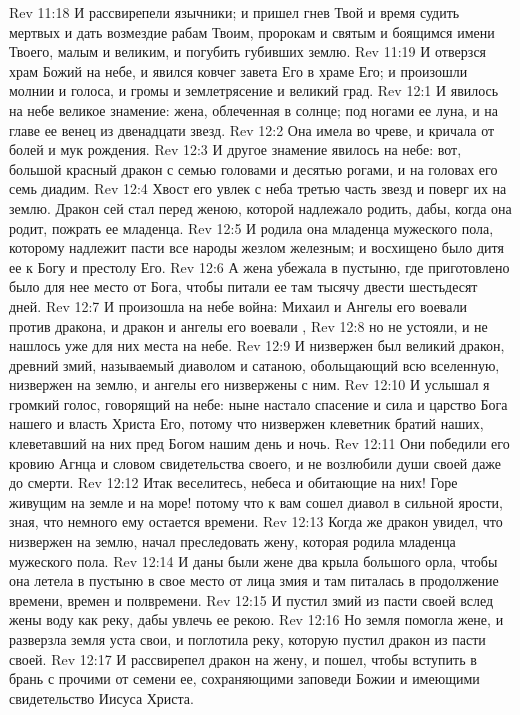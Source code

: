 \vs Rev 11:18 И рассвирепели язычники; и пришел гнев Твой и время судить мертвых и дать возмездие рабам Твоим, пророкам и святым и боящимся имени Твоего, малым и великим, и погубить губивших землю.
\rsbpar\vs Rev 11:19 И отверзся храм Божий на небе, и явился ковчег завета Его в храме Его; и произошли молнии и голоса, и громы и землетрясение и великий град.
\vs Rev 12:1 И явилось на небе великое знамение: жена, облеченная в солнце; под ногами ее луна, и на главе ее венец из двенадцати звезд.
\vs Rev 12:2 Она имела во чреве, и кричала от болей и мук рождения.
\vs Rev 12:3 И другое знамение явилось на небе: вот, большой красный дракон с семью головами и десятью рогами, и на головах его семь диадим.
\vs Rev 12:4 Хвост его увлек с неба третью часть звезд и поверг их на землю. Дракон сей стал перед женою, которой надлежало родить, дабы, когда она родит, пожрать ее младенца.
\vs Rev 12:5 И родила она младенца мужеского пола, которому надлежит пасти все народы жезлом железным; и восхищено было дитя ее к Богу и престолу Его.
\vs Rev 12:6 А жена убежала в пустыню, где приготовлено было для нее место от Бога, чтобы питали ее там тысячу двести шестьдесят дней.
\rsbpar\vs Rev 12:7 И произошла на небе война: Михаил и Ангелы его воевали против дракона, и дракон и ангелы его воевали ,
\vs Rev 12:8 но не устояли, и не нашлось уже для них места на небе.
\vs Rev 12:9 И низвержен был великий дракон, древний змий, называемый диаволом и сатаною, обольщающий всю вселенную, низвержен на землю, и ангелы его низвержены с ним.
\vs Rev 12:10 И услышал я громкий голос, говорящий на небе: ныне настало спасение и сила и царство Бога нашего и власть Христа Его, потому что низвержен клеветник братий наших, клеветавший на них пред Богом нашим день и ночь.
\vs Rev 12:11 Они победили его кровию Агнца и словом свидетельства своего, и не возлюбили души своей даже до смерти.
\vs Rev 12:12 Итак веселитесь, небеса и обитающие на них! Горе живущим на земле и на море! потому что к вам сошел диавол в сильной ярости, зная, что немного ему остается времени.
\rsbpar\vs Rev 12:13 Когда же дракон увидел, что низвержен на землю, начал преследовать жену, которая родила младенца мужеского пола.
\vs Rev 12:14 И даны были жене два крыла большого орла, чтобы она летела в пустыню в свое место от лица змия и там питалась в продолжение времени, времен и полвремени.
\vs Rev 12:15 И пустил змий из пасти своей вслед жены воду как реку, дабы увлечь ее рекою.
\vs Rev 12:16 Но земля помогла жене, и разверзла земля уста свои, и поглотила реку, которую пустил дракон из пасти своей.
\vs Rev 12:17 И рассвирепел дракон на жену, и пошел, чтобы вступить в брань с прочими от семени ее, сохраняющими заповеди Божии и имеющими свидетельство Иисуса Христа.
